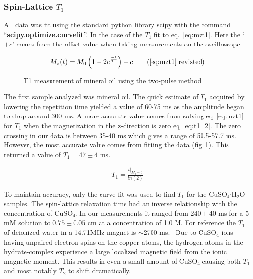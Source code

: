 \documentclass[
reprint,
amsmath,amssymb,
aps,
tikz,
border=5pt
]{revtex4-1}
\newcommand*{\cuso}[1][]{CuSO$_{4} \boldsymbol{\cdot} $H$_2$O }
\newcommand*{\tc}[1][1]{$T_#1$ }
\begin{document}
\subsubsection*{Spin-Lattice $T_1$}

    All data was fit using the standard python library scipy with the command  ``\textbf{scipy.optimize.curve\textunderscore fit}''. In the case of the \tc fit to eq.~\ref{eq:mzt1}. Here the `$+c$' comes from the offset value when taking measurements on the oscilloscope. 

    \begin{gather*}
        M_z(t) = M_0 \left(1-2 e^\frac{-t}{T_1}\right) + c \tag{\ref{eq:mzt1} revisted}
    \end{gather*}

    
    \begin{figure}[b]
        \resizebox{0.45\textwidth}{!}{}
        \caption{T1 measurement of mineral oil using the two-pulse method }
        \label{fig:mo_t1}
      \end{figure}

    The first sample analyzed was mineral oil. The quick estimate of \tc acquired by lowering the repetition time yielded a value of 60-75 ms as the amplitude began to drop around 300 ms. A more accurate value comes from solving eq~\ref{eq:mzt1} for \tc when the magnetization in the z-direction is zero eq~\ref{eq:t1_2}. The zero crossing in our data is between 35-40 ms which gives a range of 50.5-57.7 ms. However, the most accurate value comes from fitting the data (fig~\ref{fig:mo_t1}). This returned a value of $T_1=47\pm 4$ ms.

    \begin{gather}
        T_1 = \frac{t|_{M_z=0}}{ln(2)} \label{eq:t1_2}
    \end{gather}

    To maintain accuracy, only the curve fit was used to find \tc for the \cuso samples. The spin-lattice relaxation time had an inverse relationship with the concentration of CuSO$_4$. In our measurements it ranged from $240\pm40$ ms for a 5 mM solution to $0.75\pm0.05$ cm at a concentration of 1.0 M. For reference the \tc of deionized water in a 14.71MHz magnet is $\sim$2700 ms.~\cite{medphys} Due to CuSO$_4$ ions having unpaired electron spins on the copper atoms, the hydrogen atoms in the hydrate-complex experience a large localized magnetic field from the ionic magnetic moment. This results in even a small amount of CuSO$_4$ causing both \tc and most notably \tc[2] to shift dramatically.~\cite{nmr65}
\end{document}
